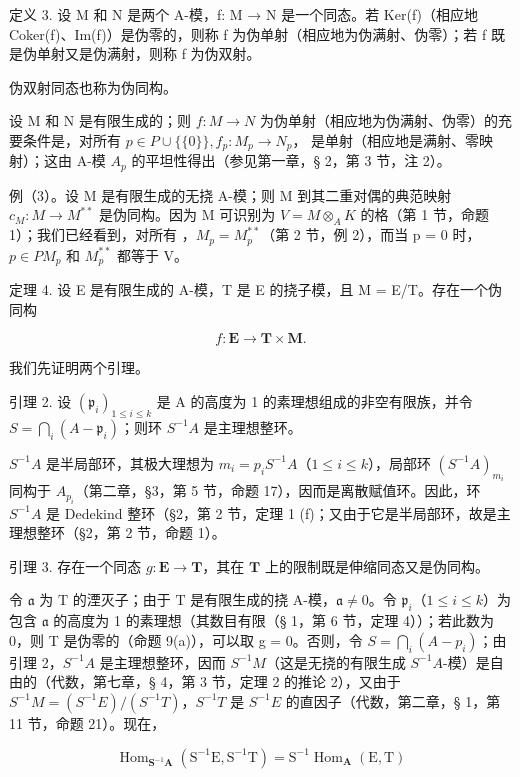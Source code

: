 定义 3. 设 M 和 N 是两个 A-模，f: M → N 是一个同态。若 Ker(f)（相应地 Coker(f)、Im(f)）是伪零的，则称 f 为伪单射（相应地为伪满射、伪零）；若 f 既是伪单射又是伪满射，则称 f 为伪双射。

伪双射同态也称为伪同构。

设 M 和 N 是有限生成的；则 \(f: M \to N\) 为伪单射（相应地为伪满射、伪零）的充要条件是，对所有 \(p \in P \cup \{\{0\}\}, f_{p}: M_{p} \to N_{p}\)， 是单射（相应地是满射、零映射）；这由 A-模 \(A_{p}\) 的平坦性得出（参见第一章，§ 2，第 3 节，注 2）。

例（3）。设 M 是有限生成的无挠 A-模；则 M 到其二重对偶的典范映射 \(c_{M}: M \to M^{**}\) 是伪同构。因为 M 可识别为 \(V = M \otimes_{A} K\) 的格（第 1 节，命题 1）；我们已经看到，对所有 ，\(M_{p} = M_{p}^{**}\)（第 2 节，例 2），而当 p = 0 时，\(p \in P\)\(M_{p}\) 和 \(M_{p}^{**}\) 都等于 V。

定理 4. 设 E 是有限生成的 A-模，T 是 E 的挠子模，且 M = E/T。存在一个伪同构

\[
f \colon \mathbf {E} \rightarrow \mathbf {T} \times \mathbf {M}.
\]

我们先证明两个引理。

引理 2. 设 \((\mathfrak{p}_i)_{1 \leqslant i \leqslant k}\) 是 A 的高度为 1 的素理想组成的非空有限族，并令 \(S = \bigcap_{i} (A - \mathfrak{p}_i)\)；则环 \(S^{-1}A\) 是主理想整环。

\(S^{-1}A\) 是半局部环，其极大理想为 \(m_{i} = p_{i}S^{-1}A\)（\(1 \leqslant i \leqslant k\)），局部环 \((S^{-1}A)_{m_{i}}\) 同构于 \(A_{p_{i}}\)（第二章，§3，第 5 节，命题 17），因而是离散赋值环。因此，环 \(S^{-1}A\) 是 Dedekind 整环（§2，第 2 节，定理 1 (f)；又由于它是半局部环，故是主理想整环（§2，第 2 节，命题 1）。

引理 3. 存在一个同态 \(g: \mathbf{E} \to \mathbf{T}\)，其在 \(\mathbf{T}\) 上的限制既是伸缩同态又是伪同构。

令 \(\mathfrak{a}\) 为 \(\mathrm{T}\) 的湮灭子；由于 \(\mathrm{T}\) 是有限生成的挠 A-模，\(\mathfrak{a} \neq 0\)。令 \(\mathfrak{p}_i\)（\(1 \leqslant i \leqslant k\)）为包含 \(\mathfrak{a}\) 的高度为 1 的素理想（其数目有限（§ 1，第 6 节，定理 4））；若此数为 0，则 T 是伪零的（命题 9(a)），可以取 g = 0。否则，令 \(S = \bigcap_{i} (A - p_{i})\)；由引理 2，\(S^{-1}A\) 是主理想整环，因而 \(S^{-1}M\)（这是无挠的有限生成 \(S^{-1}A\)-模）是自由的（代数，第七章，§ 4，第 3 节，定理 2 的推论 2），又由于 \(S^{-1}M = (S^{-1}E)/(S^{-1}T)\)，\(S^{-1}T\) 是 \(S^{-1}E\) 的直因子（代数，第二章，§ 1，第 11 节，命题 21）。现在，

\[
\operatorname{Hom} _ {\mathbf {S} ^ {- 1} \mathbf {A}} (\mathrm{S} ^ {- 1} \mathrm{E}, \mathrm{S} ^ {- 1} \mathrm{T}) = \mathrm{S} ^ {- 1} \operatorname{Hom} _ {\mathbf {A}} (\mathrm{E}, \mathrm{T})
\]

